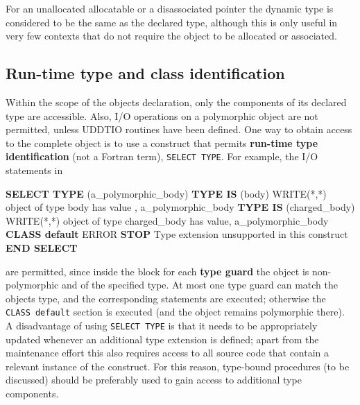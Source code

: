 \documentclass[
]{scrartcl}
\newenvironment{Shaded}{}{}
\newcommand{\FunctionTok}[1]{\textcolor[rgb]{0.02,0.16,0.49}{#1}}
\newcommand{\KeywordTok}[1]{\textcolor[rgb]{0.00,0.44,0.13}{\textbf{#1}}}
\newcommand{\NormalTok}[1]{#1}
\newcommand{\StringTok}[1]{\textcolor[rgb]{0.25,0.44,0.63}{#1}}
\begin{document}
For an unallocated allocatable or a disassociated pointer the dynamic
type is considered to be the same as the declared type, although this is
only useful in very few contexts that do not require the object to be
allocated or associated.

\subsection{Run-time type and class
identification}\label{run-time-type-and-class-identification}

Within the scope of the object\textquotesingle s declaration, only the
components of its declared type are accessible. Also, I/O operations on
a polymorphic object are not permitted, unless UDDTIO routines have been
defined. One way to obtain access to the complete object is to use a
construct that permits \textbf{run-time type identification} (not a
Fortran term), \texttt{SELECT\ TYPE}. For example, the I/O statements in

\begin{Shaded}
\begin{Highlighting}[]
\KeywordTok{SELECT TYPE}\NormalTok{ (a\_polymorphic\_body)}
\KeywordTok{TYPE IS}\NormalTok{ (body)}
   \FunctionTok{WRITE(*}\NormalTok{,}\FunctionTok{*)} \StringTok{\textquotesingle{}object of type body has value        \textquotesingle{}}\NormalTok{, a\_polymorphic\_body}
\KeywordTok{TYPE IS}\NormalTok{ (charged\_body)}
   \FunctionTok{WRITE(*}\NormalTok{,}\FunctionTok{*)} \StringTok{\textquotesingle{}object of type charged\_body has value\textquotesingle{}}\NormalTok{, a\_polymorphic\_body}
\KeywordTok{CLASS default}
\NormalTok{   ERROR }\KeywordTok{STOP} \StringTok{\textquotesingle{}Type extension unsupported in this construct\textquotesingle{}}
\KeywordTok{END SELECT}
\end{Highlighting}
\end{Shaded}

are permitted, since inside the block for each \textbf{type guard} the
object is non-polymorphic and of the specified type. At most one type
guard can match the object\textquotesingle s type, and the corresponding
statements are executed; otherwise the \texttt{CLASS\ default} section
is executed (and the object remains polymorphic there). A disadvantage
of using \texttt{SELECT\ TYPE} is that it needs to be appropriately
updated whenever an additional type extension is defined; apart from the
maintenance effort this also requires access to all source code that
contain a relevant instance of the construct. For this reason,
type-bound procedures (to be discussed) should be preferably used to
gain access to additional type components.
\end{document}
